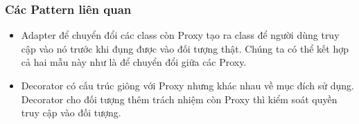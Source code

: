 \subsubsection{Các Pattern liên quan}
\begin{itemize}
    \item Adapter để chuyển đổi các class còn Proxy tạo ra class để người dùng truy cập vào nó trước khi đụng được vào đối tượng thật. Chúng ta có thể kết hợp cả hai mẫu này như là để chuyển đổi giữa các Proxy.
    \item Decorator có cấu trúc giông với Proxy nhưng khác nhau về mục đích sử dụng. Decorator cho đối tượng thêm trách nhiệm còn Proxy thì kiểm soát quyền truy cập vào đối tượng.
\end{itemize}